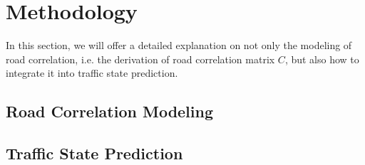 
\section{Methodology}
In this section, we will offer a detailed explanation on not only the modeling of road correlation, i.e. the derivation of road correlation matrix $C$, but also how to integrate it into traffic state prediction.

\subsection{Road Correlation Modeling}


\subsection{Traffic State Prediction}
